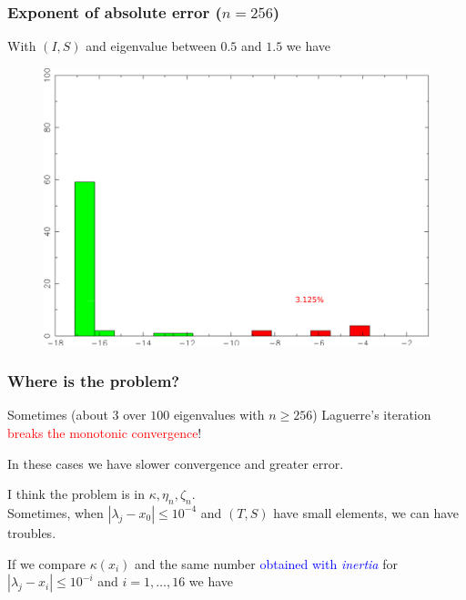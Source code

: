 \documentclass{beamer}
\theoremstyle{definition} \newtheorem{de}{Def}
\theoremstyle{remark} \newtheorem{os}[de]{Remark}
\theoremstyle{plain} \newtheorem{te}[de]{Teo}
\theoremstyle{plain} \newtheorem{co}[de]{Cor}
\theoremstyle{plain} \newtheorem{pr}[de]{Prop}
\theoremstyle{plain} \newtheorem{lem}[de]{Lemm}
\theoremstyle{remark} \newtheorem{rem}[de]{Remark}
\begin{document}
\begin{frame}
  \frametitle{Exponent of absolute error ($n=256$)}
  With $(I,S)$ and eigenvalue between $0.5$ and $1.5$ we have

  \begin{figure}
    \centering
    \includegraphics[scale=0.3]{images/IstogrammaEsponentiErrori_256.pdf}
  \end{figure}

\end{frame}


\begin{frame}
  \frametitle{Where is the problem?}

   Sometimes (about $3$ over $100$ eigenvalues with $n \ge 256$) Laguerre's iteration \textcolor{red}{breaks the monotonic convergence}! 

   \pause

   In these cases we have slower convergence and greater error.

   \pause

   I think the problem is in $\kappa,\eta_n,\zeta_n$. \\ Sometimes, when $|\lambda_j - x_0|\le 10^{-4}$ and $(T,S)$ have small elements, we can have troubles.

   \pause

   If we compare $\kappa(x_i)$ and the same number \textcolor{blue}{obtained with \emph{inertia}} for $|\lambda_j - x_i|\le 10^{-i}$ and $i=1,\dots,16$ we have
 
\end{frame}
\end{document}
